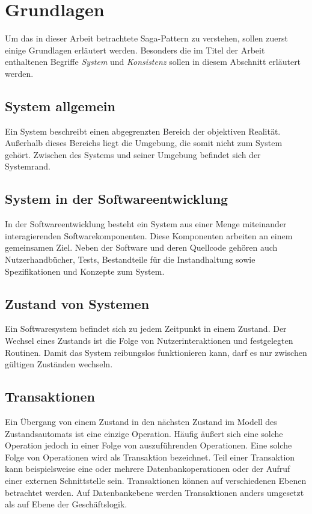 \section{Grundlagen}

Um das in dieser Arbeit betrachtete Saga-Pattern zu verstehen, sollen zuerst einige Grundlagen erläutert werden. Besonders die im Titel der Arbeit enthaltenen Begriffe \textit{System} und \textit{Konsistenz} sollen in diesem Abschnitt erläutert werden. 

\subsection{System allgemein}
Ein System beschreibt einen abgegrenzten Bereich der objektiven Realität. Außerhalb dieses Bereichs liegt die Umgebung, die somit nicht zum System gehört. Zwischen des Systems und seiner Umgebung befindet sich der Systemrand. 

\subsection{System in der Softwareentwicklung}
In der Softwareentwicklung besteht ein System aus einer Menge miteinander interagierenden Softwarekomponenten. Diese Komponenten arbeiten an einem gemeinsamen Ziel. Neben der Software und deren Quellcode gehören auch Nutzerhandbücher, Tests, Bestandteile für die Instandhaltung sowie Spezifikationen und Konzepte zum System. 

\subsection{Zustand von Systemen}
Ein Softwaresystem befindet sich zu jedem Zeitpunkt in einem Zustand. Der Wechsel eines Zustands ist die Folge von Nutzerinteraktionen und festgelegten Routinen. Damit das System reibungslos funktionieren kann, darf es nur zwischen gültigen Zuständen wechseln. %


\subsection{Transaktionen}
Ein Übergang von einem Zustand in den nächsten Zustand im Modell des Zustandsautomats ist eine einzige Operation. Häufig äußert sich eine solche Operation jedoch in einer Folge von auszuführenden Operationen. Eine solche Folge von Operationen wird als Transaktion bezeichnet. Teil einer Transaktion kann beispielsweise eine oder mehrere Datenbankoperationen oder der Aufruf einer externen Schnittstelle sein. Transaktionen können auf verschiedenen Ebenen betrachtet werden. Auf Datenbankebene werden Transaktionen anders umgesetzt als auf Ebene der Geschäftslogik. 

